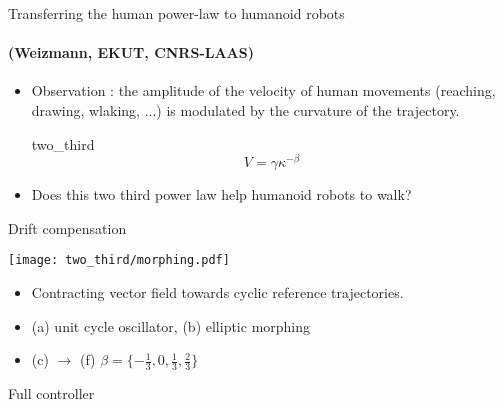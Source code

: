 

\begin{frame}{Transferring the human power-law to humanoid robots}
  \framesubtitle{(Weizmann, EKUT, CNRS-LAAS) }
  \begin{itemize}
    \item Observation : the amplitude of the velocity of human movements (reaching, drawing, wlaking, ...) is modulated by the curvature of the trajectory.\\
    \begin{beamercolorbox}[ht=4ex,dp=1ex]{two_third}
    {
    \begin{equation*}
      V = \gamma \kappa ^{-\beta}
    \end{equation*}
    }
    \end{beamercolorbox}
    \item Does this two third power law help humanoid robots to walk?
  \end{itemize}
\end{frame}

\begin{frame}{Drift compensation}
\vspace*{-0.8cm}  
  \begin{center}
    \texttt{[image: two\_third/morphing.pdf]}
  \end{center}
  \vspace*{-0.5cm}
  \begin{itemize}
    \item Contracting vector field towards cyclic reference trajectories.
    \item (a) unit cycle oscillator, (b) elliptic morphing
    \item (c) $\rightarrow$ (f) $\beta=\{-\frac{1}{3},0,\frac{1}{3},\frac{2}{3}\}$
  \end{itemize}
\end{frame}

\begin{frame}{Full controller}
  \begin{center}
    \scalebox{0.7}{} \\
  \end{center}
\end{frame}

